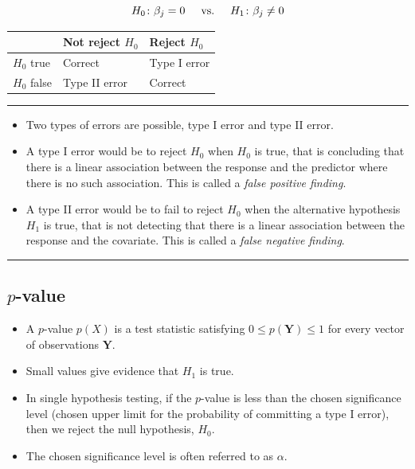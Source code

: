 \documentclass[
  letterpaper,
  DIV=11,
  numbers=noendperiod]{scrartcl}
\providecommand{\tightlist}{%
  \setlength{\itemsep}{0pt}\setlength{\parskip}{0pt}}\usepackage{longtable,booktabs,array}
\begin{document}
\[H_{0}\colon \beta_j=0 \hspace{0.5cm} \text{vs.} \hspace{0.5cm} H_{1}\colon \beta_j \neq 0\]

\begin{longtable}[]{@{}lll@{}}
\toprule()
& Not reject \(H_0\) & Reject \(H_0\) \\
\midrule()
\endhead
\(H_0\) true & Correct & Type I error \\
\(H_0\) false & Type II error & Correct \\
\bottomrule()
\end{longtable}

\begin{center}\rule{0.5\linewidth}{0.5pt}\end{center}

\begin{itemize}
\tightlist
\item
  Two types of errors are possible, type I error and type II error.
\item
  A type I error would be to reject \(H_0\) when \(H_0\) is true, that
  is concluding that there is a linear association between the response
  and the predictor where there is no such association. This is called a
  \emph{false positive finding}.
\item
  A type II error would be to fail to reject \(H_0\) when the
  alternative hypothesis \(H_1\) is true, that is not detecting that
  there is a linear association between the response and the covariate.
  This is called a \emph{false negative finding}.
\end{itemize}

\begin{center}\rule{0.5\linewidth}{0.5pt}\end{center}

\hypertarget{p-value}{%
\subsection{\texorpdfstring{\(p\)-value}{p-value}}\label{p-value}}

\begin{itemize}
\tightlist
\item
  A \(p\)-value \(p(X)\) is a test statistic satisfying
  \(0 \leq p({\boldsymbol Y}) \leq 1\) for every vector of observations
  \(\boldsymbol{Y}\).
\item
  Small values give evidence that \(H_1\) is true.
\item
  In single hypothesis testing, if the \(p\)-value is less than the
  chosen significance level (chosen upper limit for the probability of
  committing a type I error), then we reject the null hypothesis,
  \(H_0\).
\item
  The chosen significance level is often referred to as \(\alpha\).
\end{itemize}
\end{document}
